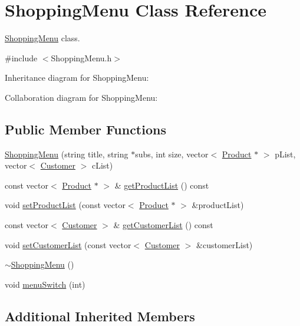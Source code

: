 \hypertarget{classShoppingMenu}{}\section{Shopping\+Menu Class Reference}
\label{classShoppingMenu}


\hyperlink{classShoppingMenu}{Shopping\+Menu} class.  




{\ttfamily \#include $<$Shopping\+Menu.\+h$>$}



Inheritance diagram for Shopping\+Menu\+:


Collaboration diagram for Shopping\+Menu\+:
\subsection*{Public Member Functions}
\begin{DoxyCompactItemize}
\item 
\hyperlink{classShoppingMenu_a1a36a442a55a5bca62a0e3761d9f5a7d}{Shopping\+Menu} (string title, string $\ast$subs, int size, vector$<$ \hyperlink{classProduct}{Product} $\ast$ $>$ p\+List, vector$<$ \hyperlink{classCustomer}{Customer} $>$ c\+List)
\item 
const vector$<$ \hyperlink{classProduct}{Product} $\ast$ $>$ \& \hyperlink{classShoppingMenu_af81a1862b9ec3cb70ff437b3de2f5461}{get\+Product\+List} () const 
\item 
void \hyperlink{classShoppingMenu_aff37e8a9d68eb29c6494999f41f3dd71}{set\+Product\+List} (const vector$<$ \hyperlink{classProduct}{Product} $\ast$ $>$ \&product\+List)
\item 
const vector$<$ \hyperlink{classCustomer}{Customer} $>$ \& \hyperlink{classShoppingMenu_a8d017a65d151d79156bcee91c42aae7f}{get\+Customer\+List} () const 
\item 
void \hyperlink{classShoppingMenu_a130e9b603e0307a6bc89e315b2ca968f}{set\+Customer\+List} (const vector$<$ \hyperlink{classCustomer}{Customer} $>$ \&customer\+List)
\item 
\hyperlink{classShoppingMenu_a505b7c469fb8115c26e2f7b5a9b8d9e6}{$\sim$\+Shopping\+Menu} ()
\item 
void \hyperlink{classShoppingMenu_a2ae4f8b4fafbf970b454be146858c3d6}{menu\+Switch} (int)
\end{DoxyCompactItemize}
\subsection*{Additional Inherited Members}


